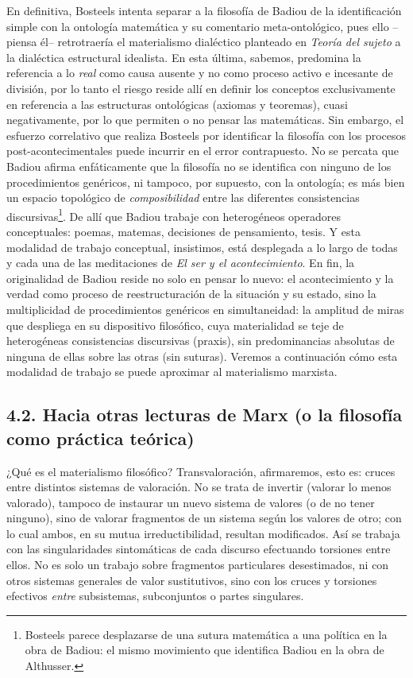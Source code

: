\documentclass{book}
\begin{document}
En definitiva, Bosteels intenta separar a la filosofía de Badiou de la
identificación simple con la ontología matemática y su comentario
meta-ontológico, pues ello --piensa él-- retrotraería el materialismo
dialéctico planteado en \emph{Teoría del sujeto} a la dialéctica
estructural idealista. En esta última, sabemos, predomina la referencia
a lo \emph{real} como causa ausente y no como proceso activo e incesante
de división, por lo tanto el riesgo reside allí en definir los conceptos
exclusivamente en referencia a las estructuras ontológicas (axiomas y
teoremas), cuasi negativamente, por lo que permiten o no pensar las
matemáticas. Sin embargo, el esfuerzo correlativo que realiza Bosteels
por identificar la filosofía con los procesos post-acontecimentales
puede incurrir en el error contrapuesto. No se percata que Badiou afirma
enfáticamente que la filosofía no se identifica con ninguno de los
procedimientos genéricos, ni tampoco, por supuesto, con la ontología; es
más bien un espacio topológico de \emph{composibilidad} entre las
diferentes consistencias discursivas\footnote{Bosteels parece
  desplazarse de una sutura matemática a una política en la obra de
  Badiou: el mismo movimiento que identifica Badiou en la obra de
  Althusser.}. De allí que Badiou trabaje con heterogéneos operadores
conceptuales: poemas, matemas, decisiones de pensamiento, tesis. Y esta
modalidad de trabajo conceptual, insistimos, está desplegada a lo largo
de todas y cada una de las meditaciones de \emph{El ser y el
acontecimiento}. En fin, la originalidad de Badiou reside no solo en
pensar lo nuevo: el acontecimiento y la verdad como proceso de
reestructuración de la situación y su estado, sino la multiplicidad de
procedimientos genéricos en simultaneidad: la amplitud de miras que
despliega en su dispositivo filosófico, cuya materialidad se teje de
heterogéneas consistencias discursivas (praxis), sin predominancias
absolutas de ninguna de ellas sobre las otras (sin suturas). Veremos a
continuación cómo esta modalidad de trabajo se puede aproximar al
materialismo marxista.

\subsection{4.2. Hacia otras lecturas de Marx (o la filosofía como práctica
teórica)}

¿Qué es el materialismo filosófico? Transvaloración, afirmaremos, esto
es: cruces entre distintos sistemas de valoración. No se trata de
invertir (valorar lo menos valorado), tampoco de instaurar un nuevo
sistema de valores (o de no tener ninguno), sino de valorar fragmentos
de un sistema según los valores de otro; con lo cual ambos, en su mutua
irreductibilidad, resultan modificados. Así se trabaja con las
singularidades sintomáticas de cada discurso efectuando torsiones entre
ellos. No es solo un trabajo sobre fragmentos particulares desestimados,
ni con otros sistemas generales de valor sustitutivos, sino con los
cruces y torsiones efectivos \emph{entre} subsistemas, subconjuntos o
partes singulares.
\end{document}
